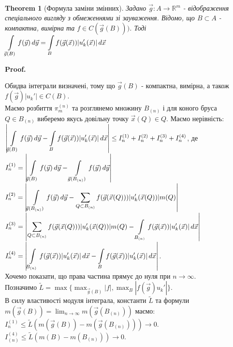 \documentclass[a4paper, 10pt]{article}
\makeatletter
\def\qed{$\blacksquare$}
\theoremstyle{theoremdd}
\newtheorem{theorem}{Theorem}[subsection]
\theoremstyle{theoremdd}
\theoremstyle{theoremdd}
\theoremstyle{theoremdd}
\theoremstyle{theoremdd}
\theoremstyle{theoremdd}
\theoremstyle{theoremdd}
\theoremstyle{theoremdd}
\renewenvironment{proof}[1][Proof.\\]{\par
\pushQED{\hfill \qed}%
\normalfont \topsep6\p@\@plus6\p@\relax
\trivlist
\item\relax
{\bfseries
#1\@addpunct{.}}\hspace\labelsep\ignorespaces
}{%
\popQED\endtrivlist\@endpefalse
}
\makeatother
\begin{document}
\begin{theorem}[Формула заміни змінних]
Задано $\vec{g}: A \to \mathbb{R}^m$ - відображення спеціального вигляду з обмеженнями зі зауваження. Відомо, що $B \subset A$ - компактна, вимірна та $f \in C(\vec{g}(B)))$. Тоді\\
$\displaystyle\int\displaylimits_{\vec{g}(B)} f(\vec{y})\,d\vec{y} = \int\displaylimits_B f(\vec{g}(\vec{x})) |u_k'(\vec{x})|\,d\vec{x}$
\end{theorem}

\begin{proof}
Обидва інтеграли визначені, тому що $\vec{g}(B)$ - компактна, вимірна, а також $f(\vec{g}) |u_k'| \in C(B)$.\\
Маємо розбиття $\pi^{(n)}_m$ та розглянемо множину $B_{(n)}$ і для коного бруса $Q \in B_{(n)}$ виберемо якусь довільну точку $\vec{x}(Q) \in Q$. Маємо нерівність:\\
$\displaystyle\abs{\int\displaylimits_{\vec{g}(B)} f(\vec{y})\,d\vec{y} - \int\displaylimits_B f(\vec{g}(\vec{x})) |u_k'(\vec{x})|\,d\vec{x} } \leq I_n^{(1)} + I_n^{(2)} + I_n^{(3)} + I_n^{(4)}$, де\\
$I_n^{(1)} = \displaystyle\abs{\int\displaylimits_{\vec{g}(B)} f(\vec{y})\,d\vec{y} -\int\displaylimits_{\vec{g}(B_{(n)})} f(\vec{y})\,d\vec{y} }$\\
$I_n^{(2)} = \displaystyle\abs{\int\displaylimits_{\vec{g}(B_{(n)})} f(\vec{y})\,d\vec{y} - \sum_{Q \subset B_{(n)}} f(\vec{g}(\vec{x}(Q))) |u_k'(\vec{x}(Q))| m(Q) }$\\
$I_n^{(3)} = \displaystyle\abs{\sum_{Q \subset B_{(n)}} f(\vec{g}(\vec{x}(Q))) |u_k'(\vec{x}(Q))| m(Q) - \int\displaylimits_{B_{(n)}} f(\vec{g}(\vec{x})) |u_k'(\vec{x})|\,d\vec{x} }$\\
$I_n^{(4)} = \displaystyle\abs{\int\displaylimits_{B_{(n)}} f(\vec{g}(\vec{x})) |u_k'(\vec{x})|\,d\vec{x} - \int\displaylimits_{B} f(\vec{g}(\vec{x})) |u_k'(\vec{x})|\,d\vec{x} }$.\\
Хочемо показати, що права частина прямує до нуля при $n \to \infty$.\\
Позначимо $\tilde{L} =\displaystyle \max \{ \max_{\vec{g}(B)} |f|, \max_{B} |f(\vec{g}) u_k'| \}$.\\
В силу властивості модуля інтеграла, константи $\tilde{L}$ та формули $m(\vec{g}(B)) = \displaystyle\lim_{n \to \infty} m(\vec{g}(B_{(n)}))$ маємо:\\
$I_{n}^{(1)} \leq \tilde{L}(m(\vec{g}(B)) - m(\vec{g}(B_{(n)}))) \to 0$.\\
$I_{(n)}^{(4)} \leq \tilde{L}(m(B) - m(B_{(n)})) \to 0$.\\

\end{proof}
\end{document}
